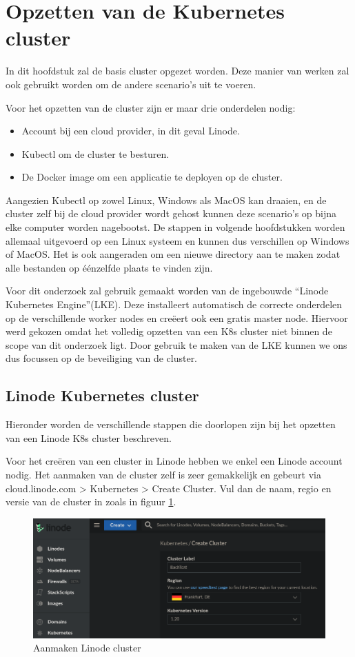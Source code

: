 \section{Opzetten van de Kubernetes cluster}
In dit hoofdstuk zal de basis cluster opgezet worden. Deze manier van werken zal ook gebruikt worden om de andere scenario's uit te voeren.

Voor het opzetten van de cluster zijn er maar drie onderdelen nodig:
\begin{itemize}
	\item Account bij een cloud provider, in dit geval Linode.
	\item Kubectl om de cluster te besturen.
	\item De Docker image om een applicatie te deployen op de cluster.
\end{itemize}

Aangezien Kubectl op zowel Linux, Windows als MacOS kan draaien, en de cluster zelf bij de cloud provider wordt gehost kunnen deze scenario's op bijna elke computer worden nagebootst. De stappen in volgende hoofdstukken worden allemaal uitgevoerd op een Linux systeem en kunnen dus verschillen op Windows of MacOS. Het is ook aangeraden om een nieuwe directory aan te maken zodat alle bestanden op éénzelfde plaats te vinden zijn.

Voor dit onderzoek zal gebruik gemaakt worden van de ingebouwde ``Linode Kubernetes Engine''(LKE). Deze installeert automatisch de correcte onderdelen op de verschillende worker nodes en creëert ook een gratis master node. Hiervoor werd gekozen omdat het volledig opzetten van een K8s cluster niet binnen de scope van dit onderzoek ligt. Door gebruik te maken van de LKE kunnen we ons dus focussen op de beveiliging van de cluster. 

\subsection{Linode Kubernetes cluster}
Hieronder worden de verschillende stappen die doorlopen zijn bij het opzetten van een Linode K8s cluster beschreven.

Voor het creëren van een cluster in Linode hebben we enkel een Linode account nodig. Het aanmaken van de cluster zelf is zeer gemakkelijk en gebeurt via cloud.linode.com > Kubernetes > Create Cluster. Vul dan de naam, regio en versie van de cluster in zoals in figuur \ref{fig:LinodeNaam}.

\begin{figure}[h]
	\centering
	\includegraphics[width=\linewidth]{img/LinodeClusterNaam.png}
	\caption{Aanmaken Linode cluster}
	\label{fig:LinodeNaam}
\end{figure}

